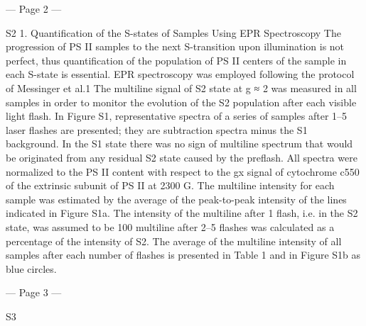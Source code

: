  


--- Page 2 ---
 
S2 
1. Quantification of the S-states of Samples Using EPR Spectroscopy 
The progression of PS II samples to the next S-transition upon illumination is not perfect, thus 
quantification of the population of PS II centers of the sample in each S-state is essential. EPR 
spectroscopy was employed following the protocol of Messinger et al.1 The multiline signal of S2 
state at g ≈ 2 was measured in all samples in order to monitor the evolution of the S2 population 
after each visible light flash. In Figure S1, representative spectra of a series of samples after 1–5 
laser flashes are presented; they are subtraction spectra minus the S1 background. In the S1 state 
there was no sign of multiline spectrum that would be originated from any residual S2 state caused 
by the preflash. All spectra were normalized to the PS II content with respect to the gx signal of 
cytochrome c550 of the extrinsic subunit of PS II at 2300 G. The multiline intensity for each sample 
was estimated by the average of the peak-to-peak intensity of the lines indicated in Figure S1a. 
The intensity of the multiline after 1 flash, i.e. in the S2 state, was assumed to be 100%
multiline after 2–5 flashes was calculated as a percentage of the intensity of S2. The average of the 
multiline intensity of all samples after each number of flashes is presented in Table 1 and in Figure 
S1b as blue circles.  
 
 
 
 
 


--- Page 3 ---
 
S3 
 
